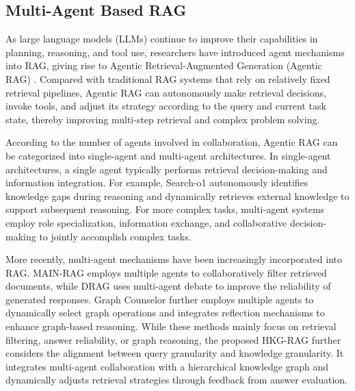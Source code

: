 \documentclass[preprint,12pt,authoryear]{elsarticle}
\begin{document}
\subsection{Multi-Agent Based RAG}
\label{subsec:multi-agent-rag}
As large language models (LLMs) continue to improve their capabilities in planning, reasoning, and tool use, researchers have introduced agent mechanisms into RAG, giving rise to Agentic Retrieval-Augmented Generation (Agentic RAG) \citep{ravuru2024agentic}. Compared with traditional RAG systems that rely on relatively fixed retrieval pipelines, Agentic RAG can autonomously make retrieval decisions, invoke tools, and adjust its strategy according to the query and current task state, thereby improving multi-step retrieval and complex problem solving.

According to the number of agents involved in collaboration, Agentic RAG can be categorized into single-agent and multi-agent architectures. In single-agent architectures, a single agent typically performs retrieval decision-making and information integration. For example, Search-o1 \citep{li2025searcho1} autonomously identifies knowledge gaps during reasoning and dynamically retrieves external knowledge to support subsequent reasoning. For more complex tasks, multi-agent systems \citep{guo2024multiagents,wu2024autogen} employ role specialization, information exchange, and collaborative decision-making to jointly accomplish complex tasks.

More recently, multi-agent mechanisms have been increasingly incorporated into RAG. MAIN-RAG \cite{chang2025mainrag} employs multiple agents to collaboratively filter retrieved documents, while DRAG \citep{hu2025drag} uses multi-agent debate to improve the reliability of generated responses. Graph Counselor \citep{gao2025graphcounselor} further employs multiple agents to dynamically select graph operations and integrates reflection mechanisms to enhance graph-based reasoning. While these methods mainly focus on retrieval filtering, answer reliability, or graph reasoning, the proposed HKG-RAG further considers the alignment between query granularity and knowledge granularity. It integrates multi-agent collaboration with a hierarchical knowledge graph and dynamically adjusts retrieval strategies through feedback from answer evaluation.


\end{document}
